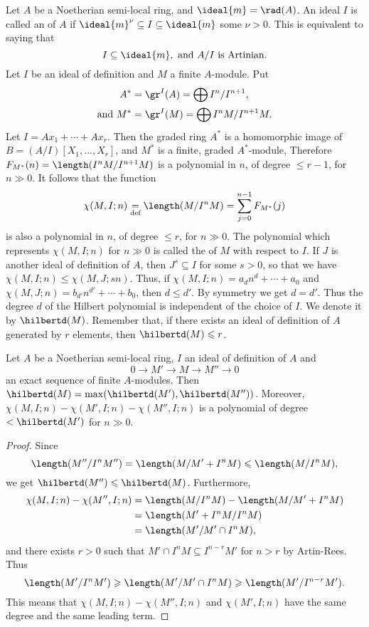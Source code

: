\documentclass[../main]{subfiles}
\begin{document}
\newparagraph Let $A$ be a Noetherian semi-local ring, and $\ideal{m}=\rad(A)$. An ideal $I$ is called an  of $A$ if $\ideal{m}^\nu \subseteq I \subseteq \ideal{m}$ some $\nu>0$. This is equivalent to saying that \[I \subseteq \ideal{m}, \text{ and }A / I\text{ is Artinian}.\] Let $I$ be an ideal of definition and $M$ a finite $A$-module. Put \begin{align*}
    A^*&=\gr^I(A)=\bigoplus I^n / I^{n+1},\\
    \text{and }M^*&=\gr^I(M)=\bigoplus I^n M/I^{n+1} M.
\end{align*}
Let $I=Ax_1+\cdots+Ax_r$. Then the graded ring $A^*$ is a homomorphic image of $B=(A / I)[X_1, \ldots, X_r]$, and $M^*$ is a finite, graded $A^*$-module, Therefore $F_{M^*}(n)=\length(I^n M / I^{n+1} M)$ is a polynomial in $n$, of degree $\leqslant r-1$, for $n\gg 0$. It follows that the function \[\chi(M, I;n)\underset{\text{def}}{=}\length(M / I^n M)=\sum_{j=0}^{n-1} F_{M^*}(j)\] is also a polynomial in $n$, of degree $\leqslant r$, for $n \gg 0$. The polynomial which represents $\chi(M, I ; n)$ for $n \gg 0$ is called the  of $M$ with respect to $I$. If $J$ is another ideal of definition of $A$, then $J^s \subseteq I$ for some $s>0$, so that we have $\chi(M, I ; n) \leqslant \chi(M, J ; s n)$. Thus, if $\chi(M, I ; n)=a_dn^d+\cdots+a_0$ and $\chi(M, J ; n)=b_{d'}n^{d'}+\cdots+b_0$, then $d\leqslant d'$. By symmetry we get $d=d'$. Thus the degree $d$ of the Hilbert polynomial is independent of the choice of $I$. We denote it by $\hilbertd(M)$. Remember that, if there exists an ideal of definition of $A$ generated by $r$ elements, then $\hilbertd(M) \leqslant r$.

\begin{parproposition}
Let $A$ be a Noetherian semi-local ring, $I$ an ideal of definition of $A$ and \[0 \longrightarrow M' \longrightarrow M \longrightarrow M'' \longrightarrow 0\] an exact sequence of finite $A$-modules. Then $\hilbertd(M)=\max(\hilbertd(M'), \hilbertd(M''))$. Moreover, $\chi(M, I ; n)-\chi(M', I ; n)-\chi(M'', I ; n)$ is a polynomial of degree $<\hilbertd(M')$ for $n \gg 0$.
\end{parproposition}

\begin{proof}
Since \[\length(M'' / I^n M'')=\length(M / M'+I^n M) \leqslant \length(M / I^n M),\] we get \newline $\hilbertd(M'') \leqslant \hilbertd(M)$. Furthermore, \[\begin{aligned}\chi(M, I ; n)-\chi(M'', I ; n)&=\length(M / I^nM)-\length(M / M'+I^n M)\\&=\length(M'+I^n M / I^n M)\\&=\length(M' / M' \cap I^n M),\end{aligned}\] and there exists $r>0$ such that $M' \cap I^n M \subseteq I^{n-r} M'$ for $n>r$ by Artin-Rees. Thus \[\length(M' / I^n M') \geqslant \length(M' / M' \cap I^n M) \geqslant \length(M' / I^{n-r} M').\] This means that $\chi(M, I ; n)-\chi(M'', I ; n)$ and $\chi(M', I ; n)$ have the same degree and the same leading term.
\end{proof}
\end{document}
